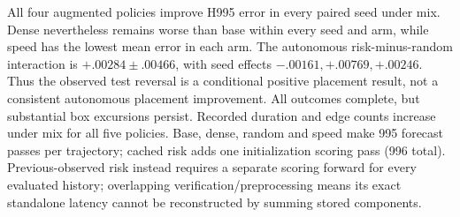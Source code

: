 All four augmented policies improve H995 error in every paired seed under mix. Dense nevertheless remains worse than base within every seed and arm, while speed has the lowest mean error in each arm. The autonomous risk-minus-random interaction is $+.00284\pm.00466$, with seed effects $-.00161,+.00769,+.00246$. Thus the observed test reversal is a conditional positive placement result, not a consistent autonomous placement improvement. All outcomes complete, but substantial box excursions persist. Recorded duration and edge counts increase under mix for all five policies. Base, dense, random and speed make 995 forecast passes per trajectory; cached risk adds one initialization scoring pass (996 total). Previous-observed risk instead requires a separate scoring forward for every evaluated history; overlapping verification/preprocessing means its exact standalone latency cannot be reconstructed by summing stored components.


